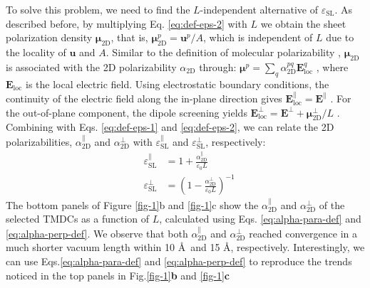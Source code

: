\documentclass[journal=ancac3,manuscript=article,email=true,hyperref=true,keywords=false]{achemso}
\begin{document}
To solve this problem, we need to
find the $L$-independent alternative of
$\varepsilon_{\mathrm{SL}}$. As described before, by multiplying
Eq. \ref{eq:def-eps-2} with $L$ we obtain the sheet polarization density
$\boldsymbol{\mu}_{\mathrm{2D}}$, that is, 
$\boldsymbol{\mu}_{\mathrm{2D}}^{p} =\boldsymbol{u}^{p}/A$, 
which is independent of $L$ due to the locality 
of $\boldsymbol{u}$ and $A$. 
%
Similar to the definition of molecular
polarizability \cite{Israelachvili_2011},
$\boldsymbol{\mu}_{\mathrm{2D}}$ is associated with the 2D
polarizability $\alpha_{\mathrm{2D}}$ through:
$\boldsymbol{\mu}^{p} = \sum_{q} \alpha_{\mathrm{2D}}^{pq}
\boldsymbol{E}_{\mathrm{loc}}^{q}$ \cite{T_bik_2004}, where
$\boldsymbol{E}_{\mathrm{loc}}$ is the local electric field. 
Using electrostatic boundary conditions, 
the continuity of the electric field along the
in-plane direction gives
$\boldsymbol{E}^{\parallel}_{\mathrm{loc}}=\boldsymbol{E}^{\parallel}$
\cite{Markel_2016}. For the out-of-plane component, the dipole
screening yields
$\boldsymbol{E}_{\mathrm{loc}}^{\perp}=\boldsymbol{E}^{\perp}+\boldsymbol{\mu}_{\mathrm{2D}}^{\perp}/L$
\cite{Meyer_2001_dipole_slab,T_bik_2004}. Combining with
Eqs. \ref{eq:def-eps-1} and \ref{eq:def-eps-2}, we can relate the 2D polarizabilities,
$\alpha_{\mathrm{2D}}^{\parallel}$ and $\alpha_{\mathrm{2D}}^{\perp}$ with $\varepsilon_{\mathrm{SL}}^{\parallel}$ and $\varepsilon_{\mathrm{SL}}^{\perp}$, respectively:
%
%
\begin{subequations}
\begin{eqnarray}
  \label{eq:alpha-para-def}
  &\varepsilon_{\mathrm{SL}}^{\parallel} &= 1 + \frac{\alpha_{\mathrm{2D}}^{\parallel}}{\varepsilon_{0}L}\\
  \label{eq:alpha-perp-def}
  &\varepsilon_{\mathrm{SL}}^{\perp} &= \left(1 - {\displaystyle \frac{\alpha_{\mathrm{2D}}^{\perp}}{\varepsilon_{\mathrm{0}} L}} \right)^{-1}
\end{eqnarray}
\end{subequations}
%
%
The bottom panels of Figure \ref{fig-1}b and \ref{fig-1}c show the
$\alpha_{\mathrm{2D}}^{\parallel}$ and $\alpha_{\mathrm{2D}}^{\perp}$
of the selected TMDCs as a function of $L$, calculated using
Eqs. \ref{eq:alpha-para-def} and \ref{eq:alpha-perp-def}. We observe
that both $\alpha_{\mathrm{2D}}^{\parallel}$ and $\alpha_{\mathrm{2D}}^{\perp}$ reached 
convergence in a much shorter vacuum length within 10 \AA ~and 15 \AA, respectively. 
%
%
Interestingly, we can use Eqs.\ref{eq:alpha-para-def} and \ref{eq:alpha-perp-def} 
to reproduce the trends noticed in the top panels in Fig.\ref{fig-1}{\bf b} and \ref{fig-1}{\bf c}  
\end{document}
